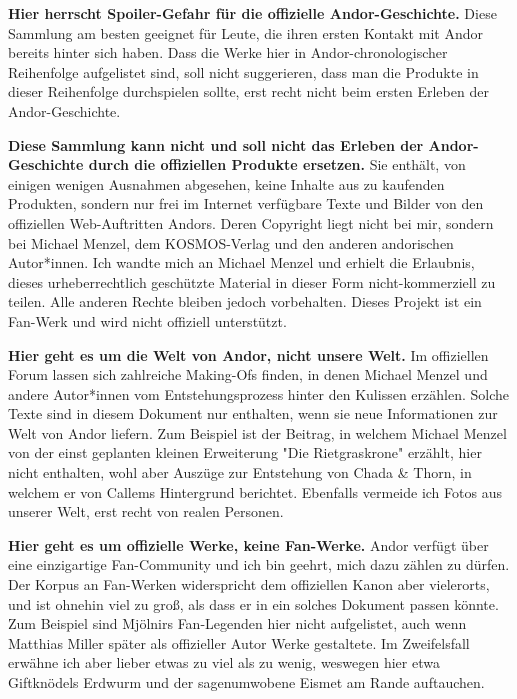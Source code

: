 \documentclass[10pt, a4paper, oneside]{book}
\newcommand{\fillbreak}{\vspace*{\fill}\columnbreak}
\begin{document}
\begin{multicols}{2}
\textbf{Hier herrscht Spoiler-Gefahr für die offizielle Andor-Geschichte.} Diese Sammlung am besten geeignet für Leute, die ihren ersten Kontakt mit Andor bereits hinter sich haben. Dass die Werke hier in Andor-chronologischer Reihenfolge aufgelistet sind, soll nicht suggerieren, dass man die Produkte in dieser Reihenfolge durchspielen sollte, erst recht nicht beim ersten Erleben der Andor-Geschichte.\bigskip

\fillbreak

\textbf{Diese Sammlung kann nicht und soll nicht das Erleben der Andor-Geschichte durch die offiziellen Produkte ersetzen.} Sie enthält, von einigen wenigen Ausnahmen abgesehen, keine Inhalte aus zu kaufenden Produkten, sondern nur frei im Internet verfügbare Texte und Bilder von den offiziellen Web-Auftritten Andors. Deren Copyright liegt nicht bei mir, sondern bei Michael Menzel, dem KOSMOS-Verlag und den anderen andorischen Autor*innen. Ich wandte mich an Michael Menzel und erhielt die Erlaubnis, dieses urheberrechtlich geschützte Material in dieser Form nicht-kommerziell zu teilen. Alle anderen Rechte bleiben jedoch vorbehalten. Dieses Projekt ist ein Fan-Werk und wird nicht offiziell unterstützt.\bigskip

\textbf{Hier geht es um die Welt von Andor, nicht unsere Welt.} Im offiziellen Forum lassen sich zahlreiche Making-Ofs finden, in denen Michael Menzel und andere Autor*innen vom Entstehungsprozess hinter den Kulissen erzählen. Solche Texte sind in diesem Dokument nur enthalten, wenn sie neue Informationen zur Welt von Andor liefern. Zum Beispiel ist der Beitrag, in welchem Michael Menzel von der einst geplanten kleinen Erweiterung "Die Rietgraskrone" erzählt, hier nicht enthalten, wohl aber Auszüge zur Entstehung von Chada \& Thorn, in welchem er von Callems Hintergrund berichtet. Ebenfalls vermeide ich Fotos aus unserer Welt, erst recht von realen Personen.\bigskip

\textbf{Hier geht es um offizielle Werke, keine Fan-Werke.} Andor verfügt über eine einzigartige Fan-Community und ich bin geehrt, mich dazu zählen zu dürfen. Der Korpus an Fan-Werken widerspricht dem offiziellen Kanon aber vielerorts, und ist ohnehin viel zu groß, als dass er in ein solches Dokument passen könnte. Zum Beispiel sind Mjölnirs Fan-Legenden hier nicht aufgelistet, auch wenn Matthias Miller später als offizieller Autor Werke gestaltete. Im Zweifelsfall erwähne ich aber lieber etwas zu viel als zu wenig, weswegen hier etwa Giftknödels Erdwurm und der sagenumwobene Eismet am Rande auftauchen.\bigskip


\end{multicols}
\end{document}
